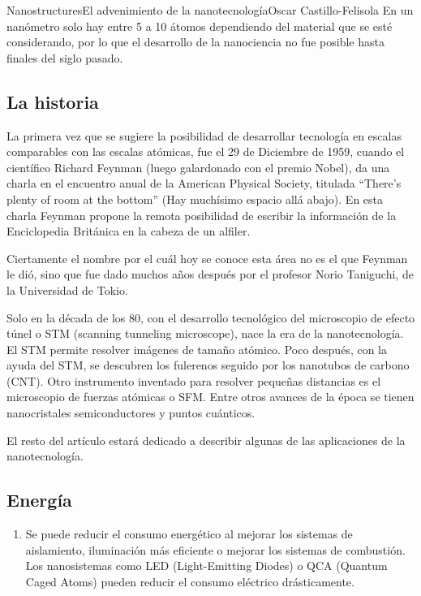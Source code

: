 \begin{article}{Nanostructures}{El advenimiento de la nanotecnolog\'ia}{Oscar Castillo-Felisola}
En un nan\'ometro solo hay entre 5 a 10 \'atomos dependiendo del material que se est\'e considerando, por lo que el desarrollo de la nanociencia no fue posible hasta finales del siglo pasado.



\subsection{La historia}

La primera vez que se sugiere la posibilidad de desarrollar tecnolog\'ia en escalas comparables con las escalas at\'omicas, fue el 29 de Diciembre de 1959, cuando  el cient\'ifico Richard Feynman (luego galardonado con el premio Nobel), da una charla  en el encuentro anual de la American Physical  Society, titulada ``There's plenty of room at the bottom'' (Hay much\'isimo espacio all\'a abajo). En esta charla Feynman propone la remota posibilidad de escribir la informaci\'on de la Enciclopedia Brit\'anica en la cabeza de un alfiler.

Ciertamente el nombre por el cu\'al hoy se conoce esta \'area no es el que Feynman le di\'o, sino que fue dado muchos a\~nos despu\'es por el profesor Norio Taniguchi, de la Universidad de Tokio.


Solo en la d\'ecada de los 80, con el desarrollo tecnol\'ogico del microscopio de efecto t\'unel o STM (scanning 
tunneling microscope), nace la era de la nanotecnolog\'ia. El STM permite resolver im\'agenes de tama\~no at\'omico.
Poco despu\'es, con la ayuda del STM, se descubren los fulerenos seguido por los nanotubos de carbono (CNT). Otro instrumento inventado para resolver peque\~nas distancias es el microscopio de fuerzas at\'omicas o SFM. Entre otros avances de la \'epoca se tienen  nanocristales semiconductores y  puntos cu\'anticos.

El resto del art\'iculo estar\'a dedicado a describir algunas de las aplicaciones de la nanotecnolog\'ia.%



\subsection{Energ\'ia}
\begin{enumerate}
\item 
Se puede reducir el consumo energ\'etico al mejorar los sistemas de aislamiento, iluminaci\'on m\'as eficiente o mejorar los sistemas de combusti\'on. Los nanosistemas como LED (Light-Emitting Diodes) o QCA (Quantum Caged Atoms) pueden reducir el consumo el\'ectrico dr\'asticamente.


\end{enumerate}
\end{article}
